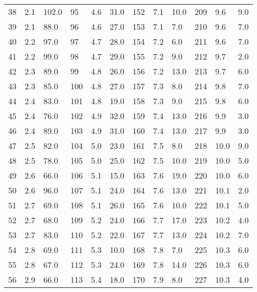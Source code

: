 \begin{table}
{\begin{tabular}{@{}lll|lll|lll|lll@{}}
     38 & 2.1 & 102.0 & 95 & 4.6 & 31.0 & 152 & 7.1 & 10.0 & 209 & 9.6 & 9.0  \\ 
     39 & 2.1 & 88.0 & 96 & 4.6 & 27.0 & 153 & 7.1 & 7.0 & 210 & 9.6 & 7.0  \\ 
     40 & 2.2 & 97.0 & 97 & 4.7 & 28.0 & 154 & 7.2 & 6.0 & 211 & 9.6 & 7.0  \\ 
     41 & 2.2 & 99.0 & 98 & 4.7 & 29.0 & 155 & 7.2 & 9.0 & 212 & 9.7 & 2.0  \\ 
     42 & 2.3 & 89.0 & 99 & 4.8 & 26.0 & 156 & 7.2 & 13.0 & 213 & 9.7 & 6.0  \\ 
     43 & 2.3 & 85.0 & 100 & 4.8 & 27.0 & 157 & 7.3 & 8.0 & 214 & 9.8 & 7.0  \\ 
     44 & 2.4 & 83.0 & 101 & 4.8 & 19.0 & 158 & 7.3 & 9.0 & 215 & 9.8 & 6.0  \\ 
     45 & 2.4 & 76.0 & 102 & 4.9 & 32.0 & 159 & 7.4 & 13.0 & 216 & 9.9 & 3.0  \\ 
     46 & 2.4 & 89.0 & 103 & 4.9 & 31.0 & 160 & 7.4 & 13.0 & 217 & 9.9 & 3.0  \\ 
     47 & 2.5 & 82.0 & 104 & 5.0 & 23.0 & 161 & 7.5 & 8.0 & 218 & 10.0 & 9.0  \\ 
     48 & 2.5 & 78.0 & 105 & 5.0 & 25.0 & 162 & 7.5 & 10.0 & 219 & 10.0 & 5.0  \\ 
     49 & 2.6 & 66.0 & 106 & 5.1 & 15.0 & 163 & 7.6 & 19.0 & 220 & 10.0 & 6.0  \\ 
     50 & 2.6 & 96.0 & 107 & 5.1 & 24.0 & 164 & 7.6 & 13.0 & 221 & 10.1 & 2.0  \\ 
     51 & 2.7 & 69.0 & 108 & 5.1 & 26.0 & 165 & 7.6 & 10.0 & 222 & 10.1 & 5.0  \\ 
     52 & 2.7 & 68.0 & 109 & 5.2 & 24.0 & 166 & 7.7 & 17.0 & 223 & 10.2 & 4.0  \\ 
     53 & 2.7 & 83.0 & 110 & 5.2 & 22.0 & 167 & 7.7 & 13.0 & 224 & 10.2 & 7.0  \\ 
     54 & 2.8 & 69.0 & 111 & 5.3 & 10.0 & 168 & 7.8 & 7.0 & 225 & 10.3 & 6.0  \\ 
     55 & 2.8 & 67.0 & 112 & 5.3 & 24.0 & 169 & 7.8 & 14.0 & 226 & 10.3 & 6.0  \\ 
     56 & 2.9 & 66.0 & 113 & 5.4 & 18.0 & 170 & 7.9 & 8.0 & 227 & 10.3 & 4.0  \\ 
     \bottomrule
    \end{tabular}}
    \label{tab:Lebensdauer}
\end{table}
